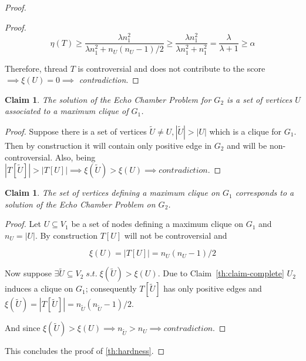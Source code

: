 \documentclass{article}
\newtheorem{claim}[theorem]{Claim}
\begin{document}
\begin{proof}
\begin{proof}
		\begin{equation}
			\eta(T) \geq \frac{\lambda n_{1} ^{2} }{\lambda n_{1} ^{2} + n_U
				(n_U -1)/2 }
			\geq \frac{\lambda n_{1} ^{2} }{\lambda n_{1} ^{2} + n_{1} ^{2}  }
			= \frac{\lambda }{\lambda + 1} \geq \alpha
		\end{equation}

		Therefore, thread $T$ is controversial and does not
		contribute to the score $\implies \xi(U) = 0 \implies$ \emph{contradiction}.
	\end{proof}

	\begin{claim}
		\label{th:max-clique}
		The solution of the Echo Chamber Problem for $G_2$ is a set of vertices
		$U$ associated to a \emph{maximum clique} of $G_1$.
	\end{claim}

	\begin{proof}
		Suppose there is a set of vertices $\tilde{U} \neq U, |\tilde{U}| >
			|U|$ which is a clique for $G_1$. Then by construction it will
		contain only positive edge in $G_2$ and will be
		non-controversial. Also, being $|T[\tilde{U}]| > |T[U]| \implies
			\xi(\tilde{U}) > \xi(U) \implies contradiction$.
	\end{proof}

	\begin{claim}
		The set of vertices defining a maximum clique on $G_1$
		corresponds to a solution of the Echo Chamber Problem on $G_2$.
	\end{claim}

	\begin{proof}
		Let $U \subseteq V_1$ be a set of nodes defining a maximum clique on
		$G_1$ and $n_{U} = |U|$. By construction $T[U]$ will not be controversial and

		\begin{equation}
			\xi(U) = |T[U]| = n_{U} (n_{U} -1 )/2
		\end{equation}

		Now suppose $\exists \tilde{U} \subseteq V_2 \; s.t. \; \xi(\tilde{U})
			> \xi(U)$. Due to Claim~\ref{th:claim-complete} $U_2$ induces a
		clique on $G_1$; consequently $T[\tilde{U}]$ has only positive
		edges and $\xi(\tilde{U}) = |T[\tilde{U}]| = n_{\tilde{U}}
			(n_{\tilde{U}} - 1)/2$.

		And since $\xi(\tilde{U}) > \xi({U}) \implies n_{\tilde{U}} > n_{U}
			\implies contradiction$.
	\end{proof}

	This concludes the proof of \autoref{th:hardness}.
\end{proof}
\end{document}
